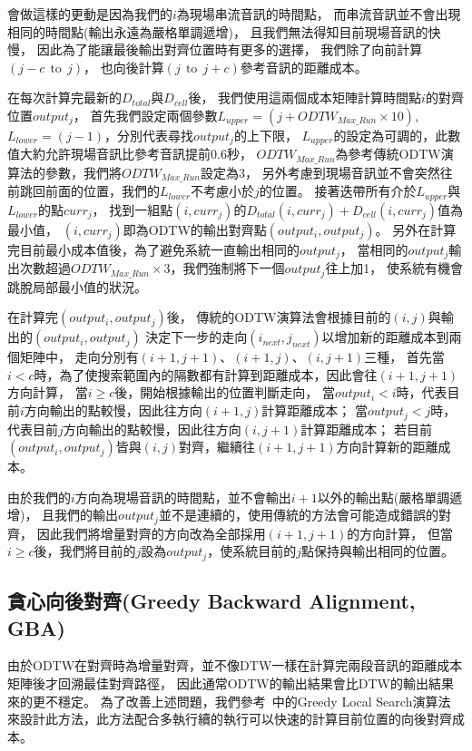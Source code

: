 \documentclass[class=NCU_thesis, crop=false]{standalone}
\begin{document}
會做這樣的更動是因為我們的$i$為現場串流音訊的時間點，
而串流音訊並不會出現相同的時間點(輸出永遠為嚴格單調遞增)，
且我們無法得知目前現場音訊的快慢，
因此為了能讓最後輸出對齊位置時有更多的選擇，
我們除了向前計算$(j-c \ \  \text{to} \ \  j)$，
也向後計算$(j \ \  \text{to} \ \  j+c)$參考音訊的距離成本。

在每次計算完最新的$D_{total}$與$D_{cell}$後，
我們使用這兩個成本矩陣計算時間點$i$的對齊位置$output_j$，
首先我們設定兩個參數$L_{upper} = (j+ODTW_{Max\_Run}\times 10)$,
$L_{lower} = (j-1)$，分別代表尋找$output_j$的上下限，
$L_{upper}$的設定為可調的，此數值大約允許現場音訊比參考音訊提前0.6秒，
$ODTW_{Max\_Run}$為參考傳統ODTW演算法的參數，我們將$ODTW_{Max\_Run}$設定為3，
另外考慮到現場音訊並不會突然往前跳回前面的位置，我們的$L_{lower}$不考慮小於$j$的位置。
接著迭帶所有介於$L_{upper}$與$L_{lower}$的點$curr_{j}$，
找到一組點$(i, curr_{j})$的$D_{total}(i, curr_{j})+D_{cell}(i, curr_{j})$值為最小值，
$(i, curr_{j})$即為ODTW的輸出對齊點$(output_i, output_j)$。
另外在計算完目前最小成本值後，為了避免系統一直輸出相同的$output_j$，
當相同的$output_j$輸出次數超過$ODTW_{Max\_Run} \times 3$，我們強制將下一個$output_j$往上加1，
使系統有機會跳脫局部最小值的狀況。

在計算完$(output_i, output_j)$後，
傳統的ODTW演算法會根據目前的$(i, j)$與輸出的$(output_i, output_j)$
決定下一步的走向$(i_{next}, j_{next})$以增加新的距離成本到兩個矩陣中，
走向分別有$(i+1, j+1)$、$(i+1, j)$、$(i, j+1)$三種，
首先當$i < c$時，為了使搜索範圍內的隔數都有計算到距離成本，因此會往$(i+1, j+1)$方向計算，
當$i \geq  c$後，開始根據輸出的位置判斷走向，
當$output_i < i$時，代表目前$i$方向輸出的點較慢，因此往方向$(i+1, j)$計算距離成本；
當$output_j < j$時，代表目前$j$方向輸出的點較慢，因此往方向$(i, j+1)$計算距離成本；
若目前$(output_i, output_j)$皆與$(i, j)$對齊，繼續往$(i+1, j+1)$方向計算新的距離成本。

由於我們的$i$方向為現場音訊的時間點，並不會輸出$i+1$以外的輸出點(嚴格單調遞增)，
且我們的輸出$output_j$並不是連續的，使用傳統的方法會可能造成錯誤的對齊，
因此我們將增量對齊的方向改為全部採用$(i+1, j+1)$的方向計算，
但當$i \geq  c$後，我們將目前的$j$設為$output_j$，使系統目前的$j$點保持與輸出相同的位置。

\subsection{貪心向後對齊(Greedy Backward Alignment, GBA)} \label{ch3-subst-GBA}
由於ODTW在對齊時為增量對齊，並不像DTW一樣在計算完兩段音訊的距離成本矩陣後才回溯最佳對齊路徑，
因此通常ODTW的輸出結果會比DTW的輸出結果來的更不穩定。
為了改善上述問題，我們參考~\cite{Arzt2010Towards}中的Greedy Local Search演算法
來設計此方法，此方法配合多執行續的執行可以快速的計算目前位置的向後對齊成本。
\end{document}
